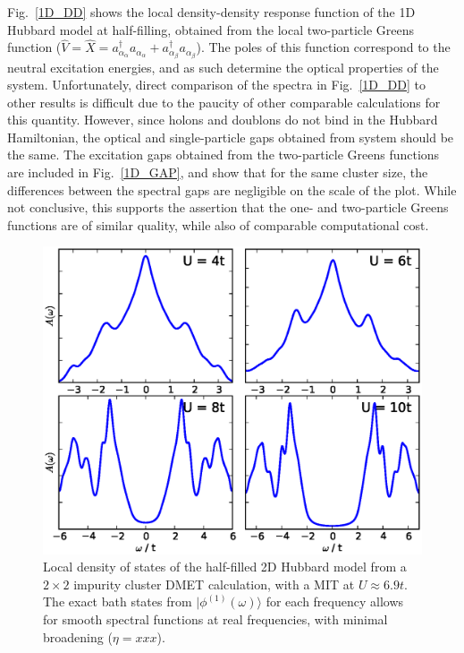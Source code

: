\documentclass[aps,twocolumn,nobibnotes]{revtex4}
\begin{document}
Fig.~\ref{1D_DD} shows the local density-density response function of the 1D Hubbard model at half-filling, obtained from the local two-particle Greens 
function (${\hat V}={\hat X}=a_{\alpha_{\alpha}}^{\dagger}a_{\alpha_{\alpha}} + a_{\alpha_{\beta}}^{\dagger}a_{\alpha_{\beta}}$). The poles of this 
function correspond to the neutral excitation energies, and as such determine 
the optical properties of the system\cite{Millis2012,Essler91}.
Unfortunately, direct comparison of the spectra in Fig.~\ref{1D_DD} to other results is difficult due to the paucity of other comparable 
calculations for this quantity.
However, since holons and doublons do not bind in the Hubbard Hamiltonian, 
the optical and single-particle gaps obtained from system should be the same. The excitation gaps
obtained from the two-particle Greens functions are included in Fig.~\ref{1D_GAP}, and show that for the same cluster size, the differences between the spectral gaps are negligible 
on the scale of the plot. While not conclusive, this supports the assertion that the one- and two-particle Greens functions are of similar quality, while also of comparable computational cost.

\begin{figure}
\begin{center}
    \vspace{-2mm}
\includegraphics[scale=0.425]{Plots/2D_Spectra/2DHub_Spectra.eps}
\end{center}
    \vspace{-8mm}
\caption{Local density of states of the half-filled 2D Hubbard model from a $2 \times 2$ impurity cluster DMET calculation, with a 
MIT at $U\approx6.9t$. 
The exact bath states from $|\phi^{(1)}(\omega)\rangle$ for each frequency allows for smooth spectral functions at real frequencies,
with minimal broadening ($\eta = xxx$).}
\label{2D_DOS}
\end{figure}
\end{document}
